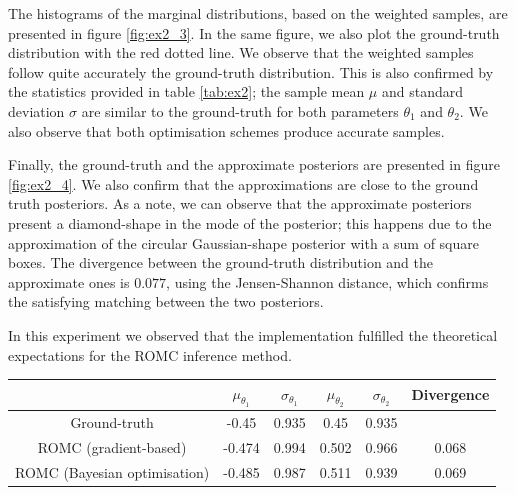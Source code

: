The histograms of the marginal distributions, based on the weighted
samples, are presented in figure \ref{fig:ex2_3}. In the same figure,
we also plot the ground-truth distribution with the red dotted
line. We observe that the weighted samples follow quite accurately the
ground-truth distribution. This is also confirmed by the statistics
provided in table \ref{tab:ex2}; the sample mean $\mu$ and standard
deviation $\sigma$ are similar to the ground-truth for both parameters
$\theta_1$ and $\theta_2$. We also observe that both optimisation
schemes produce accurate samples.

Finally, the ground-truth and the approximate posteriors are presented
in figure \ref{fig:ex2_4}. We also confirm that the approximations are
close to the ground truth posteriors. As a note, we can observe that
the approximate posteriors present a diamond-shape in the mode of the
posterior; this happens due to the approximation of the circular
Gaussian-shape posterior with a sum of square boxes. The divergence
between the ground-truth distribution and the approximate ones is
$0.077$, using the Jensen-Shannon distance, which confirms the
satisfying matching between the two posteriors.

In this experiment we observed that the implementation fulfilled the
theoretical expectations for the ROMC inference method.

\begin{center} \label{tab:ex2}
\begin{tabular}{ c|c|c|c|c|c }
\hline
& $\mu_{\theta_1}$ & $\sigma_{\theta_1}$ & $\mu_{\theta_2}$ & $\sigma_{\theta_2}$ & Divergence\\
\hline \hline
Ground-truth & -0.45 & 0.935 & 0.45 & 0.935 & \\
\hline
ROMC (gradient-based) & -0.474 & 0.994 & 0.502 & 0.966 & 0.068\\
\hline
ROMC (Bayesian optimisation) & -0.485 & 0.987 & 0.511 & 0.939 & 0.069\\
\hline
\end{tabular}
\end{center}


